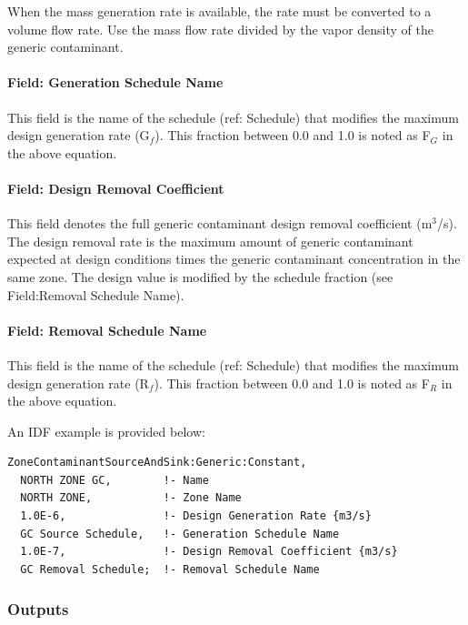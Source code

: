 When the mass generation rate is available, the rate must be converted to a volume flow rate. Use the mass flow rate divided by the vapor density of the generic contaminant.

\paragraph{Field: Generation Schedule Name}\label{field-generation-schedule-name}

This field is the name of the schedule (ref: Schedule) that modifies the maximum design generation rate (G\(_{f}\)). This fraction between 0.0 and 1.0 is noted as F\(_{G}\) in the above equation.

\paragraph{Field: Design Removal Coefficient}\label{field-design-removal-coefficient}

This field denotes the full generic contaminant design removal coefficient (m\(^{3}\)/s). The design removal rate is the maximum amount of generic contaminant expected at design conditions times the generic contaminant concentration in the same zone. The design value is modified by the schedule fraction (see Field:Removal Schedule Name).

\paragraph{Field: Removal Schedule Name}\label{field-removal-schedule-name}

This field is the name of the schedule (ref: Schedule) that modifies the maximum design generation rate (R\(_{f}\)). This fraction between 0.0 and 1.0 is noted as F\(_{R}\) in the above equation.

An IDF example is provided below:

\begin{lstlisting}
ZoneContaminantSourceAndSink:Generic:Constant,
  NORTH ZONE GC,        !- Name
  NORTH ZONE,           !- Zone Name
  1.0E-6,               !- Design Generation Rate {m3/s}
  GC Source Schedule,   !- Generation Schedule Name
  1.0E-7,               !- Design Removal Coefficient {m3/s}
  GC Removal Schedule;  !- Removal Schedule Name
\end{lstlisting}

\subsubsection{Outputs}\label{outputs-7-004}

